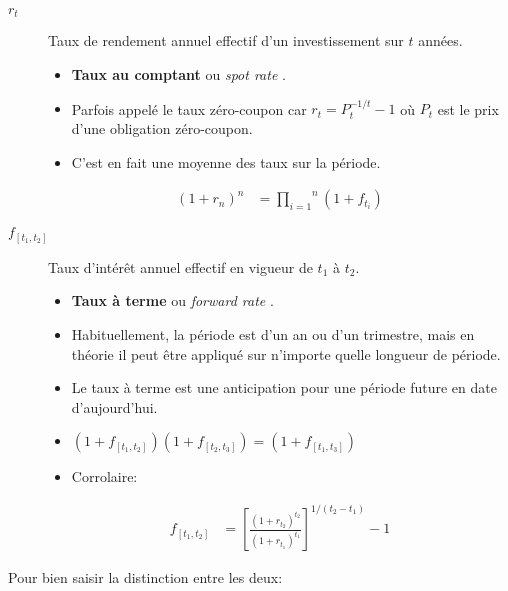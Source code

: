 \documentclass[10pt, french]{article}
\begin{document}
\begin{multicols*}{2}
\begin{distributions}[Notation]
\begin{description}
	\item[$r_{t}$]	Taux de rendement annuel effectif d'un investissement sur $t$ années.
		\begin{itemize}[leftmargin = *]
		\item	\textbf{Taux au comptant} ou \og \textit{spot rate} \fg{}.
		\item	Parfois appelé le taux zéro-coupon car $r_{t} = P_{t}^{-1/t} - 1$ où $P_{t}$ est le prix d'une obligation zéro-coupon.
		\item	C'est en fait une moyenne des taux sur la période.
		\end{itemize}
		\begin{align*}
		(1 + r_{n})^{n} 
		&=	\overset{n}{\underset{i = 1}{\prod}} (1 + f_{t_{i}})
		\end{align*}
	\item[$f_{[t_{1}, t_{2}]}$]	Taux d'intérêt annuel effectif en vigueur de $t_{1}$ à $t_{2}$.
		\begin{itemize}[leftmargin = *]
		\item	\textbf{Taux à terme} ou \og \textit{forward rate} \fg{}.
		\item	Habituellement, la période est d'un an ou d'un trimestre, mais en théorie il peut être appliqué sur n'importe quelle longueur de période.
		\item	Le taux à terme est une anticipation pour une période future en date d'aujourd'hui.
		\item	$(1 + f_{[t_{1}, t_{2}]})(1 + f_{[t_{2}, t_{3}]}) = (1 + f_{[t_{1}, t_{3}]})$
		\item	Corrolaire:
		\end{itemize}
		\begin{align*}
		f_{[t_{1}, t_{2}]}
		&=	\left[\frac{(1 + r_{t_{2}})^{t_{2}}}{(1 + r_{t_{1}})^{t_{1}}}\right]^{1/(t_{2} - t_{1})} - 1
		\end{align*}			
\end{description}
Pour bien saisir la distinction entre les deux:
\begin{center}



\begin{tikzpicture}[x=0.75pt,y=0.75pt,yscale=-1,xscale=1]


\end{tikzpicture}
\end{center}
\end{distributions}
\end{multicols*}
\end{document}
